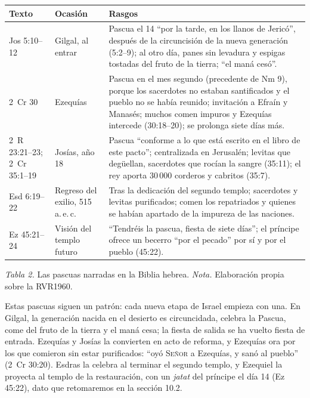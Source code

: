 \documentclass[11pt,letterpaper]{article}
\newcommand{\SENOR}{\textsc{Señor}}
\begin{document}
\begin{table}[!htbp]\centering\small\renewcommand{\arraystretch}{1.2}
\begin{tabular}{@{}L{2.5cm}L{2.9cm}L{9.0cm}@{}}
\toprule
\textbf{Texto} & \textbf{Ocasión} & \textbf{Rasgos} \\ \midrule
Jos 5:10--12 & Gilgal, al entrar & Pascua el 14 ``por la tarde, en los llanos de Jericó'', después de la circuncisión de la nueva generación (5:2--9); al otro día, panes sin levadura y espigas tostadas del fruto de la tierra; ``el maná cesó''. \\
2~Cr 30 & Ezequías & Pascua en el mes segundo (precedente de Nm 9), porque los sacerdotes no estaban santificados y el pueblo no se había reunido; invitación a Efraín y Manasés; muchos comen impuros y Ezequías intercede (30:18--20); se prolonga siete días más. \\
2~R 23:21--23; 2~Cr 35:1--19 & Josías, año 18 & Pascua ``conforme a lo que está escrito en el libro de este pacto''; centralizada en Jerusalén; levitas que degüellan, sacerdotes que rocían la sangre (35:11); el rey aporta 30\,000 corderos y cabritos (35:7). \\
Esd 6:19--22 & Regreso del exilio, 515 a.\,e.\,c. & Tras la dedicación del segundo templo; sacerdotes y levitas purificados; comen los repatriados y quienes se habían apartado de la impureza de las naciones. \\
Ez 45:21--24 & Visión del templo futuro & ``Tendréis la pascua, fiesta de siete días''; el príncipe ofrece un becerro ``por el pecado'' por sí y por el pueblo (45:22). \\
\bottomrule
\end{tabular}\par
{\footnotesize\color{sepia}\textit{Tabla 2.} Las pascuas narradas en la Biblia hebrea. \textit{Nota.} Elaboración propia sobre la RVR1960.}
\end{table}

Estas pascuas siguen un patrón: cada nueva etapa de Israel empieza con una. En Gilgal, la generación nacida en el desierto es circuncidada, celebra la Pascua, come del fruto de la tierra y el maná cesa; la fiesta de salida se ha vuelto fiesta de entrada. Ezequías y Josías la convierten en acto de reforma, y Ezequías ora por los que comieron sin estar purificados: ``oyó \SENOR{} a Ezequías, y sanó al pueblo'' (2~Cr 30:20). Esdras la celebra al terminar el segundo templo, y Ezequiel la proyecta al templo de la restauración, con un \emph{jatat} del príncipe el día 14 (Ez 45:22), dato que retomaremos en la sección 10.2.
\end{document}

